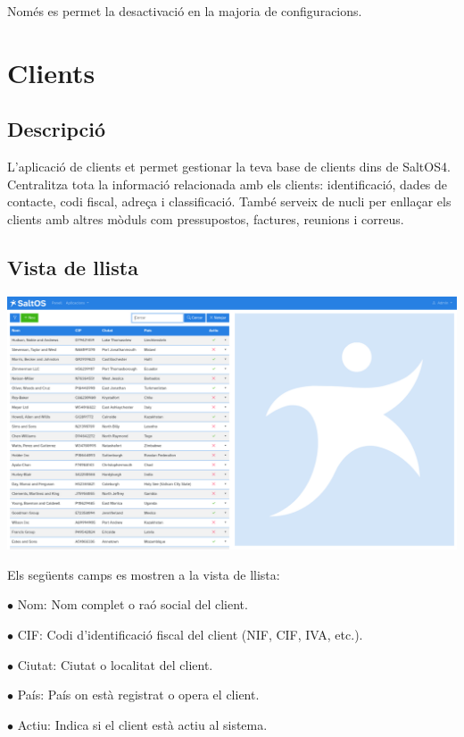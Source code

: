 \documentclass[a4paper]{article}
\begin{document}
Només es permet la desactivació en la majoria de configuracions.


\hypertarget{toc46}{}
\section{Clients}

\hypertarget{toc47}{}
\subsection{Descripció}

L'aplicació de clients et permet gestionar la teva base de clients dins de SaltOS4.
Centralitza tota la informació relacionada amb els clients: identificació, dades de contacte,
codi fiscal, adreça i classificació. També serveix de nucli per enllaçar els clients amb altres
mòduls com pressupostos, factures, reunions i correus.

\hypertarget{toc48}{}
\subsection{Vista de llista}

\begin{center}\includegraphics[width=1\textwidth]{../ujest/snaps/test-screenshots-js-screenshots-crm-customers-list-ca-es-1-snap.png}\end{center}

Els següents camps es mostren a la vista de llista:

\begin{compactitem}
\item[\color{myblue}$\bullet$] Nom: Nom complet o raó social del client.
\item[\color{myblue}$\bullet$] CIF: Codi d'identificació fiscal del client (NIF, CIF, IVA, etc.).
\item[\color{myblue}$\bullet$] Ciutat: Ciutat o localitat del client.
\item[\color{myblue}$\bullet$] País: País on està registrat o opera el client.
\item[\color{myblue}$\bullet$] Actiu: Indica si el client està actiu al sistema.
\end{compactitem}
\end{document}
